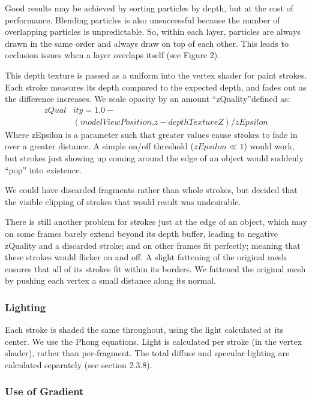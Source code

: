 \documentclass[conference]{acmsiggraph}
\begin{document}
Good results may be achieved by sorting particles by depth, but at the cost of
performance. Blending particles is also unsuccessful because the number of
overlapping particles is unpredictable. So, within each layer, particles are
always drawn in the same order and always draw on top of each other. This leads
to occlusion issues when a layer overlaps itself (see Figure 2).

This depth texture is passed as a uniform into the vertex shader for paint
strokes. Each stroke measures its depth compared to the expected depth, and
fades out as the difference increases. We scale opacity by an amount
``zQuality''defined as:
\begin{align*}
zQual&ity = 1.0 - \\
           &(modelViewPosition.z - depthTextureZ) / zEpsilon
\end{align*}
Where zEpsilon is a parameter such that greater values cause strokes to fade in
over a greater distance. A simple on/off threshold ($zEpsilon \ll 1$) would
work, but strokes just showing up coming around the edge of an object would
suddenly ``pop'' into existence.

We could have discarded fragments rather than whole strokes, but decided that
the visible clipping of strokes that would result was undesirable.

There is still another problem for strokes just at the edge of an object, which
may on some frames barely extend beyond its depth buffer, leading to negative
zQuality and a discarded stroke; and on other frames fit perfectly; meaning
that these strokes would flicker on and off. A slight fattening of the original
mesh ensures that all of its strokes fit within its borders. We fattened the
original mesh by pushing each vertex a small distance along its normal.



\subsubsection{Lighting}

Each stroke is shaded the same throughout, using the light calculated at its
center. We use the Phong equations. Light is calculated per stroke (in the
vertex shader), rather than per-fragment. The total diffuse and specular
lighting are calculated separately (see section 2.3.8).


\subsubsection{Use of Gradient}
\end{document}
